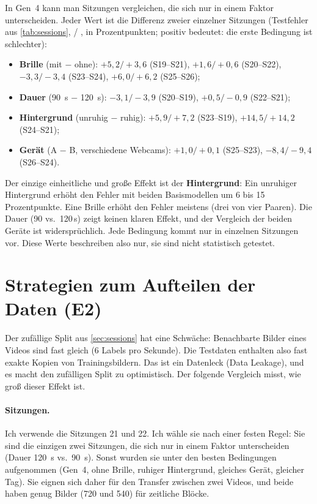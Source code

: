 In Gen~4 kann man Sitzungen vergleichen, die sich nur in einem Faktor
unterscheiden. Jeder Wert ist die Differenz zweier einzelner Sitzungen
(Testfehler aus \cref{tab:sessions},  /
, in Prozentpunkten; positiv bedeutet: die erste Bedingung
ist schlechter):
\begin{itemize}[nosep]
  \item \textbf{Brille} (mit $-$ ohne): $+5,2/+3,6$ (S19--S21),
        $+1,6/+0,6$ (S20--S22), $-3,3/-3,4$ (S23--S24), $+6,0/+6,2$ (S25--S26);
  \item \textbf{Dauer} (\SI{90}{\second} $-$ \SI{120}{\second}):
        $-3,1/-3,9$ (S20--S19), $+0,5/-0,9$ (S22--S21);
  \item \textbf{Hintergrund} (unruhig $-$ ruhig): $+5,9/+7,2$ (S23--S19),
        $+14,5/+14,2$ (S24--S21);
  \item \textbf{Gerät} (A $-$ B, verschiedene Webcams): $+1,0/+0,1$
        (S25--S23), $-8,4/-9,4$ (S26--S24).
\end{itemize}
Der einzige einheitliche und große Effekt ist der \textbf{Hintergrund}: Ein
unruhiger Hintergrund erhöht den Fehler mit beiden Basismodellen um 6 bis 15
Prozentpunkte. Eine Brille erhöht den Fehler meistens (drei von vier Paaren).
Die Dauer (90 vs.\ 120\,s) zeigt keinen klaren Effekt, und der Vergleich der
beiden Geräte ist widersprüchlich. Jede Bedingung kommt nur in einzelnen
Sitzungen vor. Diese Werte beschreiben also nur, sie sind nicht statistisch
getestet.

\section{Strategien zum Aufteilen der Daten (E2)}
\label{sec:loading}

Der zufällige Split aus \cref{sec:sessions} hat eine Schwäche: Benachbarte
Bilder eines Videos sind fast gleich (6 Labels pro Sekunde). Die Testdaten
enthalten also fast exakte Kopien von Trainingsbildern. Das ist ein Datenleck
(Data Leakage), und es macht den zufälligen Split zu optimistisch. Der
folgende Vergleich misst, wie groß dieser Effekt ist.

\paragraph{Sitzungen.} Ich verwende die Sitzungen 21 und 22. Ich wähle sie
nach einer festen Regel: Sie sind die einzigen zwei Sitzungen, die sich nur in
einem Faktor unterscheiden (Dauer \SI{120}{\second} vs.\ \SI{90}{\second}).
Sonst wurden sie unter den besten Bedingungen aufgenommen (Gen~4, ohne Brille,
ruhiger Hintergrund, gleiches Gerät, gleicher Tag). Sie eignen sich daher für den
Transfer zwischen zwei Videos, und beide haben genug Bilder (720 und 540) für
zeitliche Blöcke.

